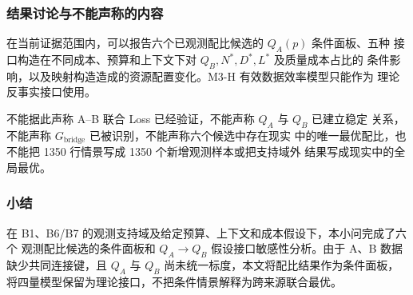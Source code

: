 \subsubsection{结果讨论与不能声称的内容}

在当前证据范围内，可以报告六个已观测配比候选的 $Q_A(p)$ 条件面板、五种
接口构造在不同成本、预算和上下文下对 $Q_B,N^*,D^*,L^*$ 及质量成本占比的
条件影响，以及映射构造造成的资源配置变化。M3-H 有效数据效率模型只能作为
理论反事实接口使用。

不能据此声称 A--B 联合 Loss 已经验证，不能声称 $Q_A$ 与 $Q_B$ 已建立稳定
关系，不能声称 $G_{\mathrm{bridge}}$ 已被识别，不能声称六个候选中存在现实
中的唯一最优配比，也不能把 1350 行情景写成 1350 个新增观测样本或把支持域外
结果写成现实中的全局最优。

\subsubsection{小结}

在 B1、B6/B7 的观测支持域及给定预算、上下文和成本假设下，本小问完成了六个
观测配比候选的条件面板和 $Q_A\to Q_B$ 假设接口敏感性分析。由于 A、B 数据
缺少共同连接键，且 $Q_A$ 与 $Q_B$ 尚未统一标度，本文将配比结果作为条件面板，
将四量模型保留为理论接口，不把条件情景解释为跨来源联合最优。
